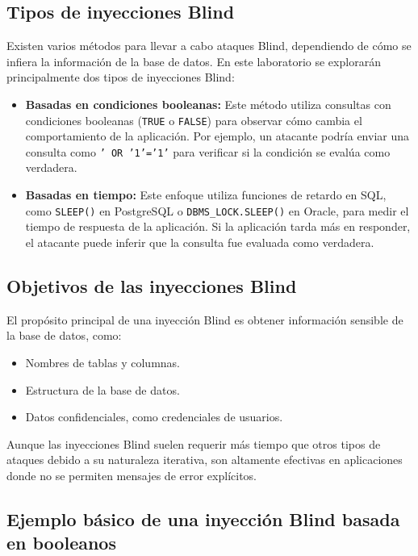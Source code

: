 \documentclass[a4paper,12pt]{article}
\begin{document}
\subsection{Tipos de inyecciones Blind}

Existen varios métodos para llevar a cabo ataques Blind, dependiendo de cómo se infiera la información de la base de datos. En este laboratorio se explorarán principalmente dos tipos de inyecciones Blind:

\begin{itemize}
    \item \textbf{Basadas en condiciones booleanas:}
    Este método utiliza consultas con condiciones booleanas (\texttt{TRUE} o \texttt{FALSE}) para observar cómo cambia el comportamiento de la aplicación. Por ejemplo, un atacante podría enviar una consulta como \texttt{' OR '1'='1'} para verificar si la condición se evalúa como verdadera.

    \item \textbf{Basadas en tiempo:}
    Este enfoque utiliza funciones de retardo en SQL, como \texttt{SLEEP()} en PostgreSQL o \texttt{DBMS\_LOCK.SLEEP()} en Oracle, para medir el tiempo de respuesta de la aplicación. Si la aplicación tarda más en responder, el atacante puede inferir que la consulta fue evaluada como verdadera.

\end{itemize}

\subsection{Objetivos de las inyecciones Blind}

El propósito principal de una inyección Blind es obtener información sensible de la base de datos, como:
\begin{itemize}
    \item Nombres de tablas y columnas.
    \item Estructura de la base de datos.
    \item Datos confidenciales, como credenciales de usuarios.
\end{itemize}

Aunque las inyecciones Blind suelen requerir más tiempo que otros tipos de ataques debido a su naturaleza iterativa, son altamente efectivas en aplicaciones donde no se permiten mensajes de error explícitos.

\subsection{Ejemplo básico de una inyección Blind basada en booleanos}
\end{document}
